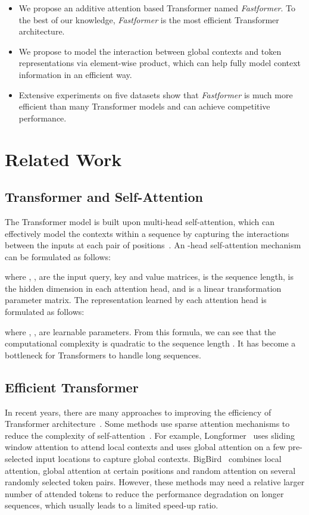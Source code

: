\documentclass[11pt,a4paper]{article}
\begin{document}
\begin{itemize}
    \item We propose an additive attention based  Transformer named \textit{Fastformer}.
    To the best of our knowledge, \textit{Fastformer} is the most efficient Transformer architecture.
    \item We propose to model the interaction between global contexts and  token representations via element-wise product, which can help fully model context information in an efficient way. 
    \item Extensive experiments on five datasets show that \textit{Fastformer} is much more efficient than many Transformer models and can achieve competitive performance.
\end{itemize} \section{Related Work}

\subsection{Transformer and Self-Attention}

The Transformer model is built upon multi-head self-attention, which can effectively model the contexts within a sequence by capturing the interactions between the inputs at each pair of positions~\cite{vaswani2017attention}.
An -head self-attention mechanism can be formulated as follows:

where , ,  are the input query, key and value matrices,  is the sequence length,  is the hidden dimension in each attention head, and  is a linear transformation parameter matrix.
The representation learned by each attention head is formulated as follows:

where , ,  are learnable parameters.
From this formula, we can see that the computational complexity is quadratic to the sequence length .
It has become a bottleneck for Transformers to handle long sequences.



\subsection{Efficient Transformer}

In recent years, there are many approaches to improving the efficiency of Transformer architecture~\cite{tay2020efficient}.
Some methods use sparse attention mechanisms to reduce the complexity of self-attention~\cite{child2019generating,beltagy2020longformer,zaheer2020big,zhang2021pooling}.
For example, Longformer~\cite{beltagy2020longformer} uses sliding window attention to attend local contexts and uses global attention on a few pre-selected input locations to capture global contexts.
BigBird~\cite{zaheer2020big} combines local attention, global attention at certain positions and random attention on several randomly selected token pairs.
However, these methods may need a relative larger  number of attended tokens to reduce the performance degradation on longer sequences, which usually leads to a limited speed-up ratio.
\end{document}
